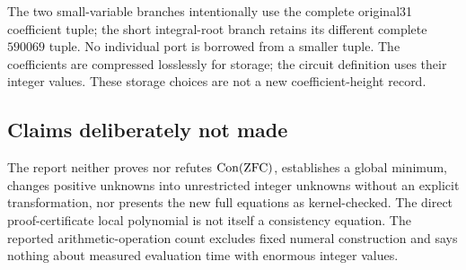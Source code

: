 The two small-variable branches intentionally use the complete original31 coefficient tuple; the short integral-root branch retains its different complete $590069$ tuple. No individual port is borrowed from a smaller tuple. The coefficients are compressed losslessly for storage; the circuit definition uses their integer values. These storage choices are not a new coefficient-height record.

\subsection{Claims deliberately not made}
The report neither proves nor refutes $\operatorname{Con}(\mathrm{ZFC})$, establishes a global minimum, changes positive unknowns into unrestricted integer unknowns without an explicit transformation, nor presents the new full equations as kernel-checked. The direct proof-certificate local polynomial is not itself a consistency equation. The reported arithmetic-operation count excludes fixed numeral construction and says nothing about measured evaluation time with enormous integer values.
